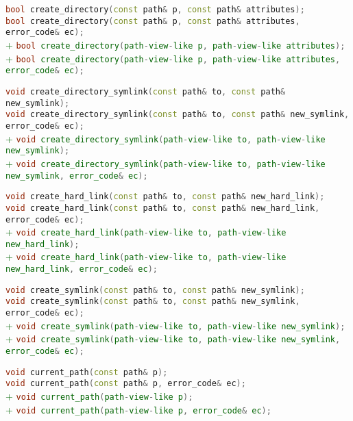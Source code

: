 \documentclass[11pt]{article}
\newcommand{\code}[2][cpp]{\lstinline[language=#1,basicstyle=\small\ttfamily]{#2}}
\newcommand{\tsreplace}[3]{\textcolor{red}{\sout{#1}}#2\textcolor{darkgreen}{#3}}
\begin{document}
\tsreplace{}{  \code{bool create_directory(const path& p, const path& attributes);}}{}\\
\tsreplace{}{  \code{bool create_directory(const path& p, const path& attributes, error_code& ec);}}{}\\
\tsreplace{}{}{+ \code{bool create_directory(path-view-like p, path-view-like attributes);}}\\
\tsreplace{}{}{+ \code{bool create_directory(path-view-like p, path-view-like attributes, error_code& ec);}}

\tsreplace{}{  \code{void create_directory_symlink(const path& to, const path& new_symlink);}}{}\\
\tsreplace{}{  \code{void create_directory_symlink(const path& to, const path& new_symlink, error_code& ec);}}{}\\
\tsreplace{}{}{+ \code{void create_directory_symlink(path-view-like to, path-view-like new_symlink);}}\\
\tsreplace{}{}{+ \code{void create_directory_symlink(path-view-like to, path-view-like new_symlink, error_code& ec);}}

\tsreplace{}{  \code{void create_hard_link(const path& to, const path& new_hard_link);}}{}\\
\tsreplace{}{  \code{void create_hard_link(const path& to, const path& new_hard_link, error_code& ec);}}{}\\
\tsreplace{}{}{+ \code{void create_hard_link(path-view-like to, path-view-like new_hard_link);}}\\
\tsreplace{}{}{+ \code{void create_hard_link(path-view-like to, path-view-like new_hard_link, error_code& ec);}}

\tsreplace{}{  \code{void create_symlink(const path& to, const path& new_symlink);}}{}\\
\tsreplace{}{  \code{void create_symlink(const path& to, const path& new_symlink, error_code& ec);}}{}\\
\tsreplace{}{}{+ \code{void create_symlink(path-view-like to, path-view-like new_symlink);}}\\
\tsreplace{}{}{+ \code{void create_symlink(path-view-like to, path-view-like new_symlink, error_code& ec);}}

\tsreplace{}{  \code{void current_path(const path& p);}}{}\\
\tsreplace{}{  \code{void current_path(const path& p, error_code& ec);}}{}\\
\tsreplace{}{}{+ \code{void current_path(path-view-like p);}}\\
\tsreplace{}{}{+ \code{void current_path(path-view-like p, error_code& ec);}}
\end{document}
